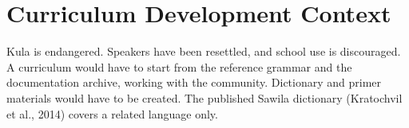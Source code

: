 \documentclass[12pt]{article}
\begin{document}
\section{Curriculum Development Context}
Kula is endangered. Speakers have been resettled, and school use is discouraged. A curriculum would have to start from the reference grammar and the documentation archive, working with the community. Dictionary and primer materials would have to be created. The published Sawila dictionary (Kratochvil et al., 2014) covers a related language only.
\end{document}
